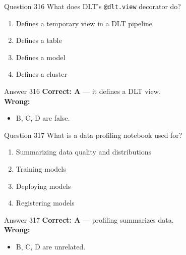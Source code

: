 \documentclass[aspectratio=169,11pt]{beamer}
\begin{document}
	\begin{frame}{Question 316}
		What does DLT's \texttt{@dlt.view} decorator do?
		\begin{enumerate}[label=\Alph*.]
			\item Defines a temporary view in a DLT pipeline
			\item Defines a table
			\item Defines a model
			\item Defines a cluster
		\end{enumerate}
	\end{frame}
	\begin{frame}{Answer 316}
		\textbf{Correct: A} --- it defines a DLT view.\\
		\vspace{0.5em}
		\textbf{Wrong:}
		\begin{itemize}
			\item B, C, D are false.
		\end{itemize}
	\end{frame}
	
	\begin{frame}{Question 317}
		What is a data profiling notebook used for?
		\begin{enumerate}[label=\Alph*.]
			\item Summarizing data quality and distributions
			\item Training models
			\item Deploying models
			\item Registering models
		\end{enumerate}
	\end{frame}
	\begin{frame}{Answer 317}
		\textbf{Correct: A} --- profiling summarizes data.\\
		\vspace{0.5em}
		\textbf{Wrong:}
		\begin{itemize}
			\item B, C, D are unrelated.
		\end{itemize}
	\end{frame}
	
\end{document}
